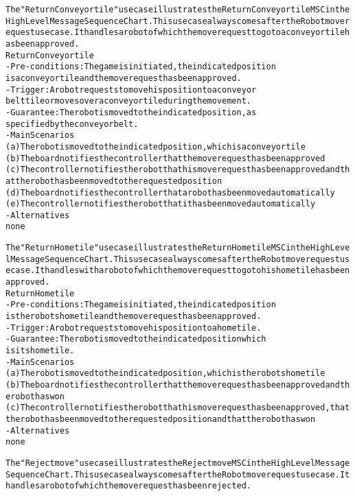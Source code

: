 \begin{alltt}
The "Return Conveyor tile" use case illustrates the Return Conveyor tile MSC in the High Level Message Sequence Chart. This use case always comes after the Robot move request use case. It handles a robot of which the move request to go to a conveyor tile has been approved. \\

Return Conveyor tile
- Pre-conditions: The game is initiated, the indicated position
    is a conveyor tile and the move request has been approved.
- Trigger: A robot requests to move his position to a conveyor
    belt tile or moves over a conveyor tile during the movement.
- Guarantee: The robot is moved to the indicated position, as
    specified by the conveyor belt.
- Main Scenarios
    (a) The robot is moved to the indicated position, which is a conveyor tile
    (b) The board notifies the controller that the move request has been approved
    (c) The controller notifies the robot that his move request has been approved and that the robot has been moved to the requested position
    (d) The board notifies the controller that a robot has been moved automatically
    (e) The controller notifies the robot that it has been moved automatically
- Alternatives \\
    none

The "Return Home tile" use case illustrates the Return Home tile MSC in the High Level Message Sequence Chart. This use case always comes after the Robot move request use case. It handles with a robot of which the move request to go to his home tile has been approved. \\

Return Home tile
- Pre-conditions: The game is initiated, the indicated position
    is the robots home tile and the move request has been approved.
- Trigger: A robot requests to move his position to a home tile.
- Guarantee: The robot is moved to the indicated position which
    is its home tile.
- Main Scenarios
    (a) The robot is moved to the indicated position, which is the robots home tile
    (b) The board notifies the controller that the move request has been approved and the robot has won
    (c) The controller notifies the robot that his move request has been approved, that the robot has been moved to the requested position and that the robot has won
- Alternatives \\
    none

The "Reject move" use case illustrates the Reject move MSC in the High Level Message Sequence Chart. This use case always comes after the Robot move request use case. It handles a robot of which the move request has been rejected. \\


\end{alltt}
